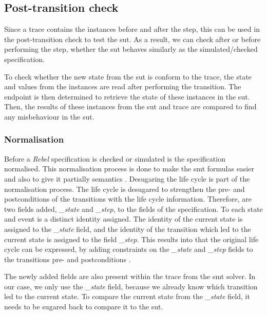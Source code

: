 \subsection{Post-transition check}

Since a trace contains the instances before and after the step, this can be used
in the post-transition check to test the \gls{sut}. As a result, we can check after or
before performing the step, whether the \gls{sut} behaves similarly as the
simulated/checked specification.

To check whether the new state from the \gls{sut} is
conform to the trace, the state and values from the instances are read after
performing the transition. The endpoint is then determined to retrieve the state
of these instances in the \gls{sut}. Then, the results of these instances from the \gls{sut}
and trace are compared to find any misbehaviour in the \gls{sut}.

\subsubsection{Normalisation}

Before a \textit{Rebel} specification is checked or simulated is the specification
normalised. This normalisation process is done to make the \gls{smt} formulas easier
and also to give it partially semantics
\cite[p.~5]{stoel_storm_vinju_bosman_2016}. Desugaring the life cycle is part of
the normalisation process. The life cycle is desugared to strengthen the pre-
and postconditions of the transitions with the life cycle information.
Therefore, are two fields added, \textit{\_state} and \textit{\_step}, to the fields of the
specification. To each state and event is a distinct identity assigned. The
identity of the current state is assigned to the \textit{\_state} field, and the identity
of the transition which led to the current state is assigned to the field
\textit{\_step}. This results into that the original life cycle can be expressed, by
adding constraints on the \textit{\_state} and \textit{\_step} fields to the transitions pre- and
postconditions \cite[p.~5]{stoel_storm_vinju_bosman_2016}.

The newly added fields
are also present within the trace from the \gls{smt} solver. In our case, we only use
the \textit{\_state} field, because we already know which transition led to the current
state. To compare the current state from the \textit{\_state} field, it needs to be
sugared back to compare it to the \gls{sut}.


